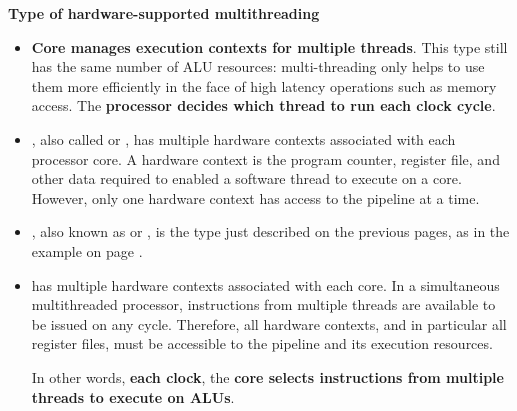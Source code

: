 \begin{flushleft}
    \textcolor{Red2}{ \textbf{Type of hardware-supported multithreading}}
\end{flushleft}
\begin{itemize}
    \item \textbf{Core manages execution contexts for multiple threads}. This type still has the same number of ALU resources: multi-threading only helps to use them more efficiently in the face of high latency operations such as memory access. The \textbf{processor decides which thread to run each clock cycle}.
    
    \item {}, also called  or , has multiple hardware contexts associated  with each processor core. A hardware context is the program counter, register file, and other data required to enabled a software thread to execute on a core. However, only one hardware context has access to the pipeline at a time.\cite{nemirovsky2022multithreading}

    \item {}, also known as  or , is the type just described on the previous pages, as in the example on page \pageref{example: core utilization}.

    \item {} has multiple hardware contexts associated with each core. In a simultaneous multithreaded processor, instructions from multiple threads are available to be issued on any cycle. Therefore, all hardware contexts, and in particular all register files, must be accessible to the pipeline and its execution resources.\cite{nemirovsky2022multithreading}
    
    In other words, \textbf{each clock}, the \textbf{core selects instructions from multiple threads to execute on ALUs}.
\end{itemize}